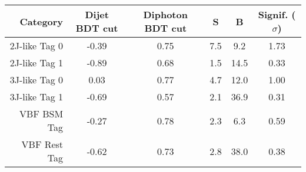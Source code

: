 \begin{tabular}{ r | c | c | c | c | c } 
\hline 
Category       & Dijet BDT cut & Diphoton BDT cut & S & B & Signif. ($\sigma$) \\ 
\hline 
2J-like  Tag 0 & -0.39        & 0.75            & 7.5    & 9.2        & 1.73         \\
2J-like  Tag 1 & -0.89        & 0.68            & 1.5    & 14.5       & 0.33         \\
3J-like  Tag 0 & 0.03         & 0.77            & 4.7    & 12.0       & 1.00         \\
3J-like  Tag 1 & -0.69        & 0.57            & 2.1    & 36.9       & 0.31         \\
VBF BSM Tag    & -0.27        & 0.78            & 2.3    & 6.3        & 0.59         \\
VBF Rest Tag   & -0.62        & 0.73            & 2.8    & 38.0       & 0.38         \\
\hline 
\end{tabular}
